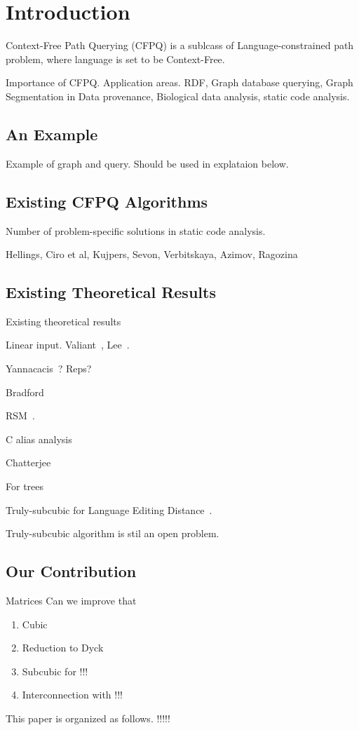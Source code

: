\section{Introduction}


Context-Free Path Querying (CFPQ) is a sublcass of Language-constrained path problem, where language is set to be Context-Free.

Importance of CFPQ. Application areas. RDF, Graph database querying, Graph Segmentation in Data provenance, Biological data analysis, static code analysis.

\subsection{An Example}

Example of graph and query. Should be used in explataion below.

\subsection{Existing CFPQ Algorithms}

Number of problem-specific solutions in static code analysis.

Hellings, Ciro et al, Kujpers, Sevon, Verbitskaya, Azimov, Ragozina 

\subsection{Existing Theoretical Results}

Existing theoretical results

Linear input. Valiant~\cite{Valiant:1975:GCR:1739932.1740048}, Lee~\cite{Lee:2002:FCG:505241.505242}.

Yannacacis~\cite{Yannakakis}? Reps?

Bradford~\cite{8249039}

RSM~\cite{10.1145/1328438.1328460}.

C alias analysis~\cite{10.1145/2714064.2660213}

Chatterjee~\cite{10.1145/3158118} 

For trees

Truly-subcubic for Language Editing Distance~\cite{doi:10.1137/17M112720X}.


Truly-subcubic algorithm is stil an open problem.

\subsection{Our Contribution}

Matrices  Can we improve that

\begin{enumerate}
\item Cubic  
\item Reduction to Dyck
\item Subcubic for !!!
\item Interconnection with !!!
\end{enumerate}

This paper is organized as follows. !!!!!

